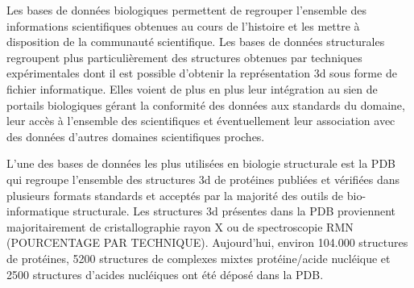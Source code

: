 Les bases de données biologiques permettent de regrouper l'ensemble des informations scientifiques obtenues au cours de l'histoire et les mettre à disposition de la communauté scientifique. Les bases de données structurales regroupent plus particulièrement des structures obtenues par techniques expérimentales dont il est possible d'obtenir la représentation 3d sous forme de fichier informatique. 
Elles voient de plus en plus leur intégration au sien de portails biologiques gérant la conformité des données aux standards du domaine, leur accès à l'ensemble des scientifiques et éventuellement leur association avec des données d'autres domaines scientifiques proches.

L'une des bases de données les plus utilisées en biologie structurale est la PDB \cite{berman_protein_2000} qui regroupe l'ensemble des structures 3d de protéines publiées et vérifiées dans plusieurs formats standards et acceptés par la majorité des outils de bio-informatique structurale. Les structures 3d présentes dans la PDB proviennent majoritairement de cristallographie rayon X ou de spectroscopie RMN (POURCENTAGE PAR TECHNIQUE). Aujourd'hui, environ 104.000 structures de protéines, 5200 structures de complexes mixtes protéine/acide nucléique et 2500 structures d'acides nucléiques ont été déposé dans la PDB.

